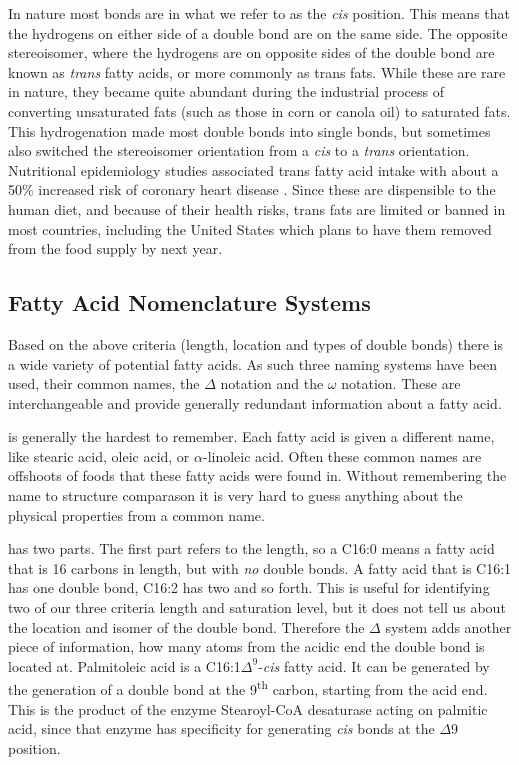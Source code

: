 \documentclass{tufte-handout}
\begin{document}
  In nature most bonds are in what we refer to as the \textit{cis} position.  This means that the hydrogens on either side of a double bond are on the same side.  The opposite stereoisomer, where the hydrogens are on opposite sides of the double bond are known as \textit{trans} fatty acids, or more commonly as trans fats.  While these are rare in nature, they became quite abundant during the industrial process of converting unsaturated fats (such as those in corn or canola oil) to saturated fats.  This hydrogenation made most double bonds into single bonds, but sometimes also switched the stereoisomer orientation from a \textit{cis} to a \textit{trans} orientation.  Nutritional epidemiology studies associated trans fatty acid intake with about a 50\% increased risk of coronary heart disease \citep{Willett1993,D.2006}.  Since these are dispensible to the human diet, and because of their health risks, trans fats are limited or banned in most countries, including the United States which plans to have them removed from the food supply by next year.  

\subsection{Fatty Acid Nomenclature Systems}

Based on the above criteria (length, location and types of double bonds) there is a wide variety of potential fatty acids.  As such three naming systems have been used, their common names, the $\Delta$ notation and the $\omega$ notation.  These are interchangeable and provide generally redundant information about a fatty acid.

 is generally the hardest to remember.  Each fatty acid is given a different name, like stearic acid, oleic acid, or $\alpha$-linoleic acid.  Often these common names are offshoots of foods that these fatty acids were found in.  Without remembering the name to structure comparason it is very hard to guess anything about the physical properties from a common name.

 has two parts.  The first part refers to the length, so a C16:0 means a fatty acid that is 16 carbons in length, but with \emph{no} double bonds.  A fatty acid that is C16:1 has one double bond, C16:2 has two and so forth.  This is useful for identifying two of our three criteria length and saturation level, but it does not tell us about the location and isomer of the double bond.  Therefore the $\Delta$ system adds another piece of information, how many atoms from the acidic end the double bond is located at.  Palmitoleic acid is a C16:1$\Delta^9$-\textit{cis} fatty acid.  It can be generated by the generation of a double bond at the 9\textsuperscript{th} carbon, starting from the acid end.  This is the product of the enzyme Stearoyl-CoA desaturase acting on palmitic acid, since that enzyme has specificity for generating \textit{cis} bonds at the $\Delta$9 position.
\end{document}
